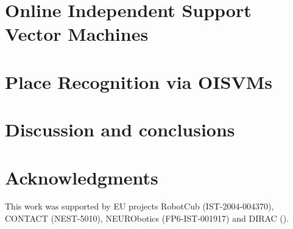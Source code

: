 \documentclass{bmvc}
\begin{document}
\section{Online Independent Support Vector Machines}
\label{sec:opt}


\section{Place Recognition via OISVMs}
\label{sec:exp}


\section{Discussion and conclusions}
\label{sec:concl}


\section*{Acknowledgments}
This work was supported by EU projects RobotCub (IST-2004-004370),
CONTACT (NEST-5010), NEURObotics (FP6-IST-001917) and DIRAC ().


{\small


}
\end{document}

